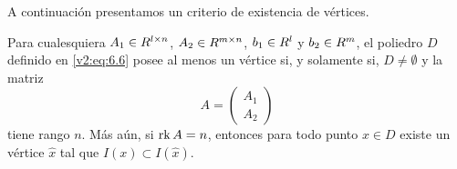 
A continuación presentamos un criterio de existencia de vértices.

\begin{theorem}\label{v2:thm:6.1.3}
    Para cualesquiera $A_1 \in R^{l \times n}$, $A_2 \in R^{m \times n}$, $b_1 \in R^l$ y $b_2 \in R^m$, el poliedro $D$ definido en \eqref{v2:eq:6.6} posee al menos un vértice si, y solamente si, $D \neq \emptyset$ y la matriz
    \[
        A = \begin{pmatrix} A_1 \\ A_2 \end{pmatrix}
    \]
    tiene rango $n$. Más aún, si $\operatorname{rk} A = n$, entonces para todo punto $x \in D$ existe un vértice $\hat{x}$ tal que $I(x) \subset I(\hat{x})$.
\end{theorem}

